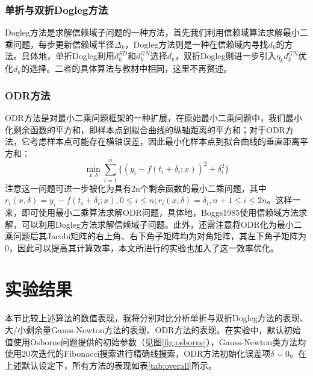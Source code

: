 \documentclass{article}
\begin{document}
\subsubsection{单折与双折Dogleg方法}
Dogleg方法是求解信赖域子问题的一种方法，首先我们利用信赖域算法求解最小二乘问题，每步更新信赖域半径$\Delta_k$，Dogleg方法则是一种在信赖域内寻找$d_k$的方法。具体地，单折Dogleg利用$d_k^{SD}$和$d_k^{GN}$选择$d_k$，双折Dogleg则进一步引入$\eta_k d_k^{GN}$优化$d_k$的选择。二者的具体算法与教材中相同，这里不再赘述。

\subsubsection{ODR方法}
ODR方法是对最小二乘问题框架的一种扩展，在原始最小二乘问题中，我们最小化剩余函数的平方和，即样本点到拟合曲线的纵轴距离的平方和；对于ODR方法，它考虑样本点可能存在横轴误差，因此最小化样本点到拟合曲线的垂直距离平方和：
\[ \min_{x,\delta} \sum\limits_{i=1}^n \{{(y_i-f(t_i+\delta_i;x))}^2 + \delta_i^2\} \]
注意这一问题可进一步被化为具有2n个剩余函数的最小二乘问题，其中$r_i(x,\delta)=y_i-f(t_i+\delta_i;x), 0\leq i\leq n; r_i(x,\delta)=\delta_i, n+1\leq i\leq 2n$。这样一来，即可使用最小二乘算法求解ODR问题，具体地，Boggs1985使用信赖域方法求解，可以利用Dogleg方法求解信赖域子问题。此外，还需注意将ODR化为最小二乘问题后其Jacobi矩阵的右上角、右下角子矩阵均为对角矩阵，其左下角子矩阵为0，因此可以提高其计算效率，本文所进行的实验也加入了这一效率优化。


\section{实验结果}
本节比较上述算法的数值表现，我将分别对比分析单折与双折Dogleg方法的表现、大/小剩余量Gauss-Newton方法的表现、ODR方法的表现。在实验中，默认初始值使用Osborne问题提供的初始参数（见图\ref{fig:osborne}），Gauss-Newton类方法均使用20次迭代的Fibonacci搜索进行精确线搜索，ODR方法初始化误差项$\delta=0$。在上述默认设定下，所有方法的表现如表\ref{tab:overall}所示。
\end{document}
